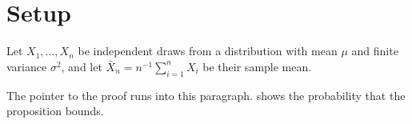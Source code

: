 \section{Setup}
\label{sec:setup}

Let $X_1, \dots, X_n$ be independent draws from a distribution with mean $\mu$ and finite variance $\sigma^2$, and let $\bar X_n = n^{-1} \sum_{i=1}^n X_i$ be their sample mean.


The pointer to the proof runs into this paragraph.
 shows the probability that the proposition bounds.


